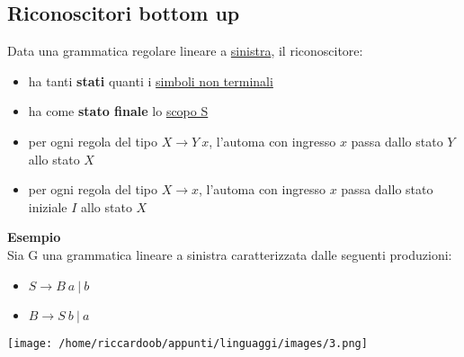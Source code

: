 \subsection{Riconoscitori bottom up}
\begin{multicols}{2}
Data una grammatica regolare lineare a \underline{sinistra}, il riconoscitore:
\begin{itemize}
    \item ha tanti \textbf{stati} quanti i \underline{simboli non terminali}
    \item ha come \textbf{stato finale} lo \underline{scopo S}
    \item per ogni regola del tipo $X \rightarrow Y\ x$, l'automa con ingresso $x$ passa dallo stato $Y$ allo stato $X$
    \item per ogni regola del tipo $X \rightarrow x$, l'automa con ingresso $x$ passa dallo stato iniziale $I$ allo stato $X$
\end{itemize}
\columnbreak
\textbf{Esempio}\\
Sia G una grammatica lineare a sinistra caratterizzata dalle seguenti produzioni:
\begin{itemize}
    \item $S \rightarrow B\ a\ |\ b$
    \item $B \rightarrow S\ b\ |\ a$
\end{itemize}
\begin{multicolfigure}
    \centering
    \texttt{[image: /home/riccardoob/appunti/linguaggi/images/3.png]}
\end{multicolfigure}
\end{multicols}

